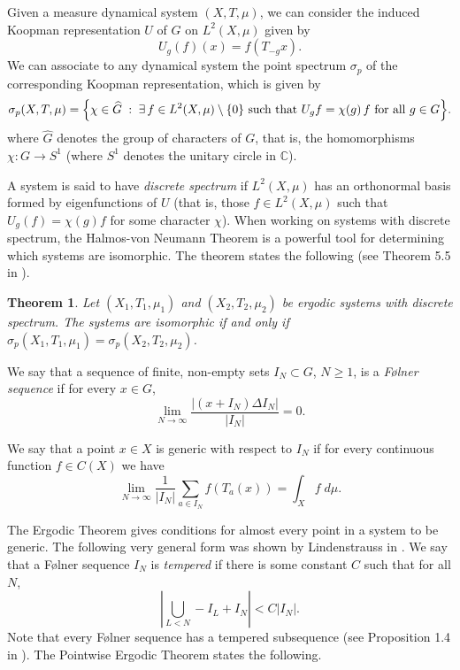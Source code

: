 \documentclass[a4paper,11pt,reqno]{amsart}
\theoremstyle{plain}
\newtheorem{theorem}{Theorem}[section]
\theoremstyle{remark}
\begin{document}
	
Given a measure dynamical system $(X,T,\mu)$, we can consider the induced Koopman representation $U$ of $G$ on $L^2(X,\mu)$ given by $$U_g(f)(x) = f(T_{-g}x).$$ We can associate to any dynamical system the point spectrum $\sigma_p$ of the corresponding Koopman representation, which is given by \[
\sigma_p(X,T,\mu)
=
\Bigl\{
\chi\in\widehat{G}\;:\;
\exists\, f\in L^2(X,\mu)\setminus\{0\}
\ \text{such that}\ 
U_g f = \chi(g)\,f
\ \text{for all } g\in G
\Bigr\}.
\] where $\widehat{G}$ denotes the group of characters of $G$, that is, the homomorphisms $\chi:G \rightarrow S^1$ (where $S^1$ denotes the unitary circle in $\mathbb{C}$).

A system is said to have \textit{discrete spectrum} if $L^2(X,\mu)$ has an orthonormal basis formed by eigenfunctions of $U$ (that is, those $f\in L^2(X,\mu)$ such that $U_g(f) = \chi(g)f$ for some character $\chi$). When working on systems with discrete spectrum, the Halmos-von Neumann Theorem is a powerful tool for determining which systems are isomorphic. The theorem states the following (see Theorem 5.5 in \cite{Hermle}).
\begin{theorem}
	\label{thm: Halmos Von Neumann}
	Let $(X_1,T_1,\mu_1)$ and $(X_2,T_2,\mu_2)$ be ergodic systems with discrete spectrum. The systems are isomorphic if and only if $\sigma_p(X_1,T_1,\mu_1) = \sigma_p(X_2,T_2,\mu_2)$.
\end{theorem}

 We say that a sequence of finite, non-empty sets $I_N \subset G$, $N \geq 1$, is a \textit{Følner sequence} if for every $x\in G$,  $$\lim_{N \rightarrow \infty} \frac{|(x+I_N) \Delta I_N|}{|I_N|} = 0.$$
	
	 We say that a point $x\in X$ is generic with respect to $I_N$ if for every continuous function $f \in C(X)$ we have $$\lim_{N \rightarrow \infty} \frac{1}{|I_N|}\sum_{a\in I_N} f(T_a(x)) = \int_X f \; d \mu.$$

	The Ergodic Theorem gives conditions for almost every point in a system to be generic. The following very general form was shown by Lindenstrauss in \cite{Lindestrauss}. We say that a Følner sequence $I_N$ is \textit{tempered} if there is some constant $C$ such that for all $N$,
	\begin{equation}
		\label{eq:tempered Følner sequence}
		\left|\bigcup_{L<N} -I_L + I_N\right| < C|I_N|.
	\end{equation}  Note that every Følner sequence has a tempered subsequence (see Proposition 1.4 in \cite{Lindestrauss}). The Pointwise Ergodic Theorem states the following.
	
\end{document}
